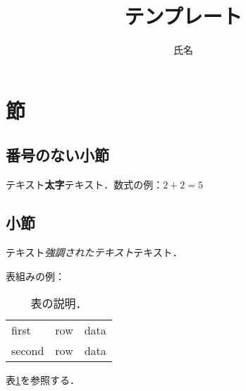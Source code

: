 \documentclass[11pt]{jarticle}
\title{テンプレート}
\author{氏名}
\begin{document}
\maketitle

\section{節}
\subsection*{番号のない小節}
テキスト\textbf{太字}テキスト．数式の例：$2+2=5$

\subsection{小節}
テキスト\emph{強調されたテキスト}テキスト．\cite{WC:1953}

表組みの例：
\begin{table}[!th]
\centering
\caption{表の説明．}
\label{tab:sample}
\begin{tabular}{|l|c|r|}
\hline
first  &  row  &  data \\
second &  row  &  data \\
\hline
\end{tabular}
\end{table}

表\ref{tab:sample}を参照する．
\end{document}
